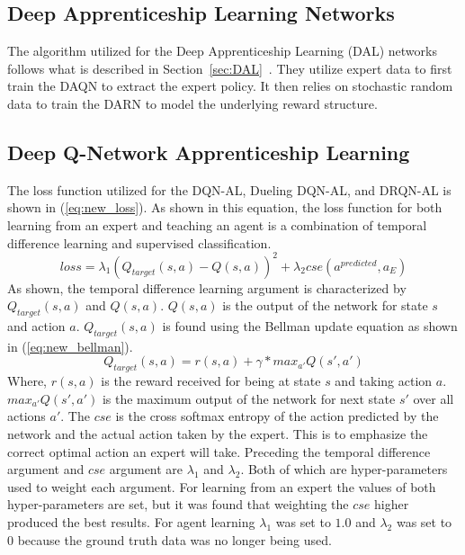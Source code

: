 \documentclass[12pt,american]{report}
\begin{document}
\subsection{Deep Apprenticeship Learning Networks}
The algorithm utilized for the Deep Apprenticeship Learning (DAL) networks follows what is described in Section~\ref{sec:DAL}~\cite{markovikj2014deep}.  They utilize expert data to first train the DAQN to extract the expert policy. It then relies on stochastic random data to train the DARN to model the underlying reward structure.

\subsection{Deep Q-Network Apprenticeship Learning}
The loss function utilized for the DQN-AL, Dueling DQN-AL, and DRQN-AL is shown in (\ref{eq:new_loss}). As shown in this equation, the loss function for both learning from an expert and teaching an agent is a combination of temporal difference learning and supervised classification.  
\begin{equation}
     \label{eq:new_loss}
     loss =\lambda_{1}(Q_{target}(s,a)-Q(s,a))^2 + \lambda_{2}cse(a^{predicted},a_E)%
\end{equation}
As shown, the temporal difference learning argument is characterized by $Q_{target}(s,a)$ and $Q(s,a)$.  $Q(s,a)$ is the output of the network for state $s$ and action $a$. $Q_{target}(s,a)$ is found using the Bellman update equation as shown in (\ref{eq:new_bellman}). 
\begin{equation}
     \label{eq:new_bellman}
     Q_{target}(s,a) = r(s,a) + \gamma *max_{a'}Q(s',a')%
\end{equation}
Where, $r(s,a)$ is the reward received for being at state $s$ and taking action $a$. $max_{a'}Q(s',a')$ is the maximum output of the network for next state $s'$ over all actions $a'$. The $cse$ is the cross softmax entropy of the action predicted by the network and the actual action taken by the expert. This is to emphasize the correct optimal action an expert will take. Preceding the temporal difference argument and $cse$ argument are $\lambda_{1}$ and $\lambda_{2}$.  Both of which are hyper-parameters used to weight each argument.  For learning from an expert the values of both hyper-parameters are set, but it was found that weighting the $cse$ higher produced the best results.  For agent learning $\lambda_{1}$ was set to $1.0$ and $\lambda_{2}$ was set to 0 because the ground truth data was no longer being used.
\end{document}
